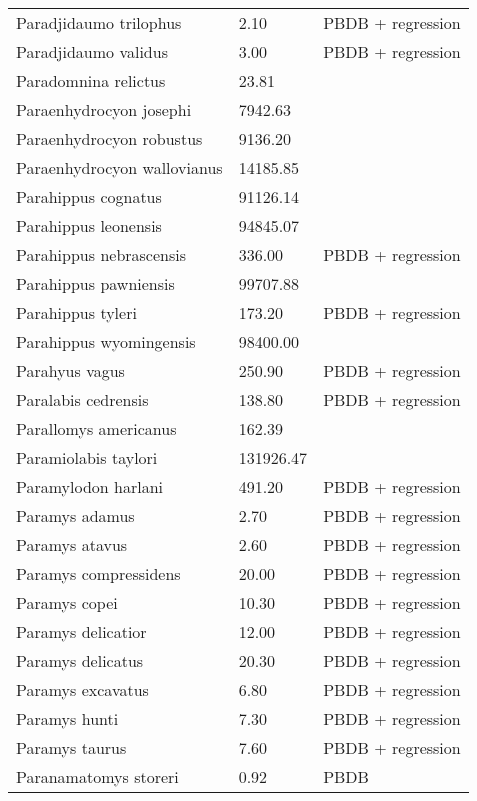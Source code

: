\begin{longtable}{p{} p{} p{}}
    Paradjidaumo trilophus & 2.10 & PBDB + regression \\ 
    Paradjidaumo validus & 3.00 & PBDB + regression \\ 
    Paradomnina relictus & 23.81 & \cite{Tomiya2013} \\ 
    Paraenhydrocyon josephi & 7942.63 & \cite{Tomiya2013} \\ 
    Paraenhydrocyon robustus & 9136.20 & \cite{Tomiya2013} \\ 
    Paraenhydrocyon wallovianus & 14185.85 & \cite{Tomiya2013} \\ 
    Parahippus cognatus & 91126.14 & \cite{Tomiya2013} \\ 
    Parahippus leonensis & 94845.07 & \cite{Tomiya2013} \\ 
    Parahippus nebrascensis & 336.00 & PBDB + regression \\ 
    Parahippus pawniensis & 99707.88 & \cite{Tomiya2013} \\ 
    Parahippus tyleri & 173.20 & PBDB + regression \\ 
    Parahippus wyomingensis & 98400.00 & \cite{MacFadden1986} \\ 
    Parahyus vagus & 250.90 & PBDB + regression \\ 
    Paralabis cedrensis & 138.80 & PBDB + regression \\ 
    Parallomys americanus & 162.39 & \cite{Tomiya2013} \\ 
    Paramiolabis taylori & 131926.47 & \cite{Tomiya2013} \\ 
    Paramylodon harlani & 491.20 & PBDB + regression \\ 
    Paramys adamus & 2.70 & PBDB + regression \\ 
    Paramys atavus & 2.60 & PBDB + regression \\ 
    Paramys compressidens & 20.00 & PBDB + regression \\ 
    Paramys copei & 10.30 & PBDB + regression \\ 
    Paramys delicatior & 12.00 & PBDB + regression \\ 
    Paramys delicatus & 20.30 & PBDB + regression \\ 
    Paramys excavatus & 6.80 & PBDB + regression \\ 
    Paramys hunti & 7.30 & PBDB + regression \\ 
    Paramys taurus & 7.60 & PBDB + regression \\ 
    Paranamatomys storeri & 0.92 & PBDB \\ 

\end{longtable}
